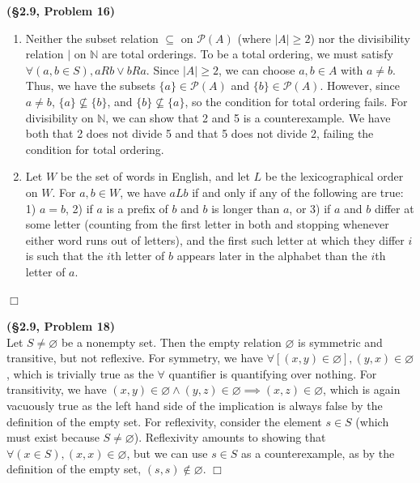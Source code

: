 \documentclass[12pt]{article}
\theoremstyle{definition}
\newenvironment{Solution}{\noindent {\sc Solution.}}{$\Box$ \vspace{2 ex}}
\begin{document}
\begin{Solution}
{\bf (\S2.9, Problem 16)}\\
\begin{enumerate}
    \item Neither the subset relation $\subseteq$ on $\mathcal P(A)$ (where $|A|\ge 2$) nor the divisibility relation $\mid$ on $\mathbb N$ are total orderings. To be a total ordering, we must satisfy $\forall(a,b\in S), aRb\lor bRa$. Since $|A| \ge 2$, we can choose $a,b\in A$ with $a\ne b$. Thus, we have the subsets $\{a\}\in \mathcal P(A)$ and $\{b\} \in \mathcal P(A)$. However, since $a\ne b$, $\{a\} \not \subseteq \{b\}$, and $\{b\}\not\subseteq \{a\}$, so the condition for total ordering fails. For divisibility on $\mathbb N$, we can show that 2 and 5 is a counterexample. We have both that 2 does not divide 5 and that 5 does not divide 2, failing the condition for total ordering.
    \item Let $W$ be the set of words in English, and let $L$ be the lexicographical order on $W$. For $a,b\in W$, we have $aLb$ if and only if any of the following are true: 1) $a=b$, 2) if $a$ is a prefix of $b$ and $b$ is longer than $a$, or 3) if $a$ and $b$ differ at some letter (counting from the first letter in both and stopping whenever either word runs out of letters), and the first such letter at which they differ $i$ is such that the $i$th letter of $b$ appears later in the alphabet than the $i$th letter of $a$.
\end{enumerate}
\end{Solution}

\vspace{0.5cm}

\begin{Solution}
{\bf (\S2.9, Problem 18)}\\
Let $S\ne \varnothing$ be a nonempty set. Then the empty relation $\varnothing$ is symmetric and transitive, but not reflexive. For symmetry, we have $\forall[(x,y)\in \varnothing], (y,x)\in \varnothing$, which is trivially true as the $\forall$ quantifier is quantifying over nothing. For transitivity, we have $(x,y)\in\varnothing\land (y,z)\in\varnothing\implies (x,z)\in \varnothing$, which is again vacuously true as the left hand side of the implication is always false by the definition of the empty set. For reflexivity, consider the element $s\in S$ (which must exist because $S\ne \varnothing$). Reflexivity amounts to showing that $\forall (x\in S), (x,x)\in \varnothing$, but we can use $s\in S$ as a counterexample, as by the definition of the empty set, $(s,s)\not\in \varnothing$.
\end{Solution}
\end{document}
